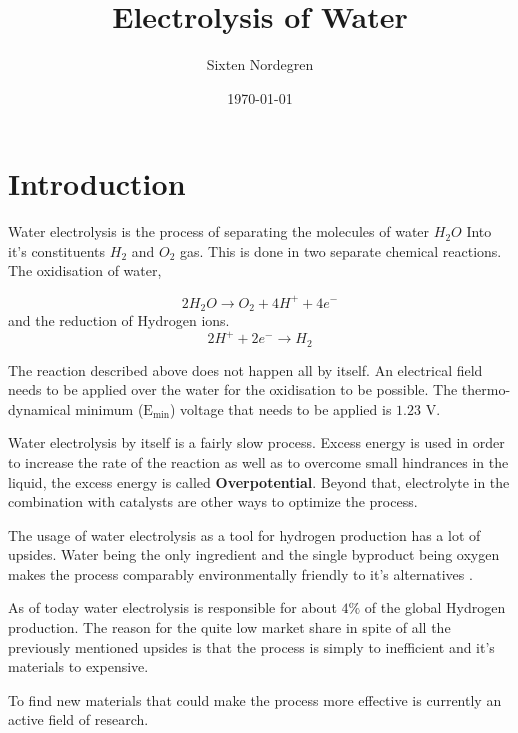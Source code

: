 \documentclass[twocolumn]{revtex4-2}
\begin{document}
\raggedbottom
\title{Electrolysis of Water}
\author{Sixten Nordegren}

\date{\today}

\maketitle
\section{Introduction}
Water electrolysis is the process of separating the molecules of water $H_2O$ Into it's 
constituents $H_2$ and $O_2$ gas. This is done in two separate chemical reactions. The
oxidisation of water,

\begin{equation}
	2H_2O \rightarrow O_2 + 4 H^+ +4e^- 
	\label{eq: oxidisation}
\end{equation}
and the reduction of Hydrogen ions.
\begin{equation}
	2 H^+ + 2e^- \rightarrow H_2
	\label{eq: reduction}
\end{equation}

The reaction described above does not happen all by itself. An electrical field needs to be
applied over the water for the oxidisation to be possible. The 
thermo-dynamical minimum ($\text{E}_{\text{min}}$) voltage that needs to be applied is $1.23$ V. 

\par
Water electrolysis by itself is a fairly slow process. Excess energy is used in order to increase
the rate of the reaction as well as to overcome small hindrances in the liquid, the excess energy 
is called \textbf{Overpotential}. Beyond that, electrolyte
in the combination with catalysts are other ways to optimize the process. 
\par
The usage of water electrolysis as a tool for hydrogen production has a lot of upsides. Water being the 
only ingredient and the single byproduct being oxygen makes the process comparably
environmentally friendly to it's alternatives \cite{DOSSANTOS2017563}.
\par 
As of today water electrolysis is responsible for about $4\%$\cite{ZENG2010307} of the global Hydrogen
production. The reason for the quite low market share in spite of all the previously mentioned upsides 
is that the process is simply to inefficient and it's materials to expensive\cite{SHIVAKUMAR2019442}.

To find new materials that could make the process more effective is currently an active field of 
research.
\end{document}
